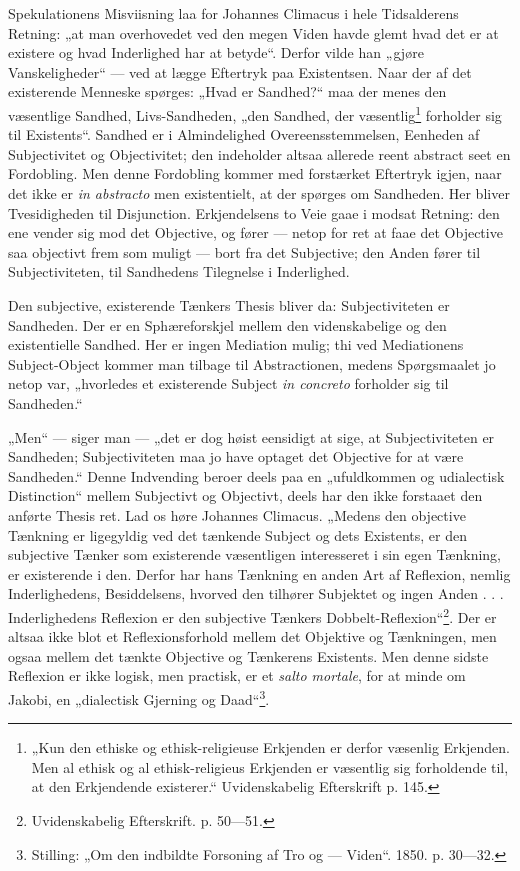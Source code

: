 \documentclass[12pt,a4paper]{book}
\newcommand{\opage}[1]{\marginnote{\footnotesize\textit{[#1]}}}
\begin{document}
Spekulationens Misviisning laa for Johannes Climacus i hele Tidsalderens Retning: „at man overhovedet ved den megen Viden havde glemt hvad det er at existere og hvad Inderlighed har at betyde“. Derfor vilde han „gjøre Vanskeligheder“ --- ved at lægge Eftertryk paa Existentsen. Naar der af det existerende Menneske spørges: „Hvad er Sandhed?“ maa der menes den væsentlige Sandhed, Livs-Sandheden, „den Sandhed, der væsentlig\footnote{%
„Kun den ethiske og ethisk-religieuse Erkjenden er derfor væsenlig Erkjenden. Men al ethisk og al ethisk-religieus Erkjenden er væsentlig sig forholdende til, at den Erkjendende existerer.“ Uvidenskabelig Efterskrift p. 145.} forholder sig til Existents“. Sandhed er i Almindelighed Overeensstemmelsen, Eenheden af Subjectivitet og Objectivitet; den indeholder altsaa allerede reent abstract seet en Fordobling. Men denne Fordobling kommer med forstærket Eftertryk igjen, naar det ikke er \textit{in abstracto} men existentielt, at der spørges om Sandheden. Her bliver Tvesidigheden til Disjunction. Erkjendelsens to Veie gaae i modsat Retning: den ene vender sig mod det Objective, og fører --- netop for ret at faae det Objective saa objectivt frem som muligt --- bort fra det Subjective; den Anden fører til Subjectiviteten, til Sandhedens Tilegnelse i Inderlighed.

Den subjective, existerende Tænkers Thesis bliver da: Subjectiviteten er Sandheden. Der er en Sphæreforskjel mellem den videnskabelige og den existentielle Sandhed. Her er ingen Mediation mulig; thi ved Mediationens Subject-Object kommer man tilbage til Abstractionen, medens Spørgsmaalet jo netop var, „hvorledes et existerende Subject \textit{in concreto} forholder sig til Sandheden.“

\opage{22}\setcounter{footnote}{0}%
„Men“ --- siger man --- „det er dog høist eensidigt at sige, at Subjectiviteten er Sandheden; Subjectiviteten maa jo have optaget det Objective for at være Sandheden.“ Denne Indvending beroer deels paa en „ufuldkommen og udialectisk Distinction“ mellem Subjectivt og Objectivt, deels har den ikke forstaaet den anførte Thesis ret. Lad os høre Johannes Climacus. „Medens den objective Tænkning er ligegyldig ved det tænkende Subject og dets Existents, er den subjective Tænker som existerende væsentligen interesseret i sin egen Tænkning, er existerende i den. Derfor har hans Tænkning en anden Art af Reflexion, nemlig Inderlighedens, Besiddelsens, hvorved den tilhører Subjektet og ingen Anden . . . Inderlighedens Reflexion er den subjective Tænkers Dobbelt-Reflexion“\footnote{Uvidenskabelig Efterskrift. p. 50---51.}. Der er altsaa ikke blot et Reflexionsforhold mellem det Objektive og Tænkningen, men ogsaa mellem det tænkte Objective og Tænkerens Existents. Men denne sidste Reflexion er ikke logisk, men practisk, er et \textit{salto mortale}, for at minde om Jakobi, en „dialectisk Gjerning og Daad“\footnote{Stilling: „Om den indbildte Forsoning af Tro og --- Viden“. 1850. p. 30---32.}.
\end{document}
